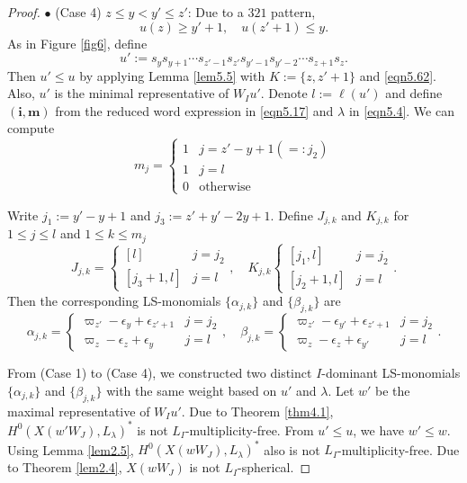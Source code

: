 \documentclass[12pt]{amsart}
\theoremstyle{definition}
\theoremstyle{remark}
\begin{document}
\begin{proof}
$\bullet$ (Case 4) $z \leq y  < y' \leq  z'$: Due to a $321$ pattern,
\begin{equation}\label{eqn5.62}
u(z) \geq y'+1, \quad u(z'+1) \leq y.
\end{equation} 
As in Figure \ref{fig6}, define
\begin{equation}\label{eqn5.17}
u':=s_y s_{y+1} \cdots s_{z'-1} s_{z'} s_{y'-1}s_{y'-2} \cdots s_{z+1}s_z.
\end{equation}
Then $u' \leq u$ by applying Lemma \ref{lem5.5} with $K:=\{z, z'+1 \}$ and \eqref{eqn5.62}. Also, $u'$ is the minimal representative of $W_Iu'$. Denote $l:= \ell (u')$ and define $(\mathbf{i}, \mathbf{m})$ from the reduced word expression in \eqref{eqn5.17} and $\lambda$ in \eqref{eqn5.4}. We can compute
\begin{equation}\label{eqn5.18}
m_j = 
\begin{cases}
1 & j = z'-y+1 (=:j_2) \\
1 & j = l \\
0 & \text{otherwise}
\end{cases}
\end{equation}

Write $j_1:= y'-y+1$ and $j_3:= z'+y'-2y+1$. Define $J_{j,k}$ and $K_{j,k}$ for $1\leq j \leq l$ and $1 \leq k \leq m_j$
\begin{equation}\label{eqn5.19}
J_{j,k} = 
\begin{cases}
[l] & j=j_2 \\
[j_3+1,l] & j = l
\end{cases}
, \quad K_{j,k}
\begin{cases}
[j_1,l] & j =j_2 \\
[j_2+1,l] & j =l
\end{cases}
.
\end{equation}
Then the corresponding LS-monomials $\{\alpha_{j,k}\}$ and $\{\beta_{j,k}\}$ are
\begin{equation}\label{eqn5.20}
\alpha_{j,k} = 
\begin{cases}
\varpi_{z'} - \epsilon_{y}+\epsilon_{z'+1} & j = j_2 \\
\varpi_z-\epsilon_z + \epsilon_y & j=l 
\end{cases}
, \quad \beta_{j,k}=
\begin{cases}
\varpi_{z'}-\epsilon_{y'}+\epsilon_{z'+1} & j=j_2 \\
\varpi_{z}-\epsilon_z + \epsilon_{y'} & j=l
\end{cases}
.
\end{equation}

From (Case 1) to (Case 4), we constructed two distinct $I$-dominant LS-monomials $\{\alpha_{j,k}\}$ and $\{\beta_{j,k}\}$ with the same weight based on $u'$ and $\lambda$. Let $w'$ be the maximal representative of $W_I u'$. Due to Theorem \ref{thm4.1}, $H^0(X(w'W_J), L_\lambda)^*$ is not $L_I$-multiplicity-free. From $u'\leq u$, we have $w' \leq w$. Using Lemma \ref{lem2.5}, $H^0(X(wW_J), L_\lambda)^*$ also is not $L_I$-multiplicity-free. Due to Theorem \ref{lem2.4}, $X(wW_J)$ is not $L_I$-spherical.
\end{proof}
\end{document}
